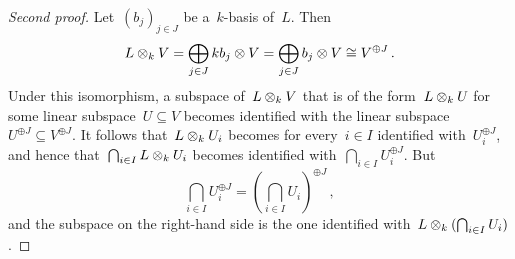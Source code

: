 \begin{proof}[Second proof]
  Let~$(b_j)_{j \in J}$ be a~$k$-basis of~$L$.
  Then
  \[
          L \mathbin{\otimes}_k V
    =     \bigoplus_{j \in J} k b_j \mathbin{\otimes} V
    =     \bigoplus_{j \in J} b_j \mathbin{\otimes} V
    \cong V^{\oplus J} \,.
  \]
  Under this isomorphism, a subspace of~$L \mathbin{\otimes}_k V$ that is of the form~$L \mathbin{\otimes}_k U$ for some linear subspace~$U \subseteq V$ becomes identified with the linear subspace~$U^{\oplus J} \subseteq V^{\oplus J}$.
  It follows that~$L \mathbin{\otimes}_k U_i$ becomes for every~$i \in I$ identified with~$U_i^{\oplus J}$, and hence that~$\bigcap_{i \in I} L \mathbin{\otimes}_k U_i$ becomes identified with~$\bigcap_{i \in I} U_i^{\oplus J}$.
  But
  \[
      \bigcap_{i \in I} U_i^{\oplus J}
    = \left( \bigcap_{i \in I} U_i \right)^{\oplus J} \,,
  \]
  and the subspace on the right-hand side is the one identified with~$L \mathbin{\otimes}_k (\bigcap_{i \in I} U_i)$.
\end{proof}




